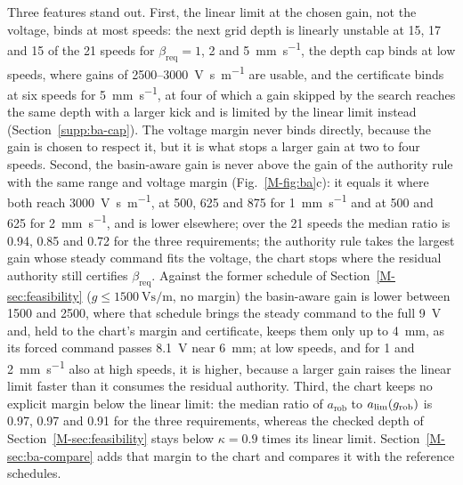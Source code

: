 Three features stand out. First, the linear limit at the chosen gain, not the voltage, binds at most speeds: the next grid depth is linearly unstable at 15, 17 and 15 of the 21 speeds for $\beta_{\mathrm{req}}=1$, 2 and \SI{5}{\milli\metre\per\second}, the depth cap binds at low speeds, where gains of 2500--\SI{3000}{\volt\second\per\metre} are usable, and the certificate binds at six speeds for \SI{5}{\milli\metre\per\second}, at four of which a gain skipped by the search reaches the same depth with a larger kick and is limited by the linear limit instead (Section~\ref{supp:ba-cap}). The voltage margin never binds directly, because the gain is chosen to respect it, but it is what stops a larger gain at two to four speeds. Second, the basin-aware gain is never above the gain of the authority rule with the same range and voltage margin (Fig.~\ref{M-fig:ba}c): it equals it where both reach \SI{3000}{\volt\second\per\metre}, at 500, 625 and \SI{875}{\rpm} for \SI{1}{\milli\metre\per\second} and at 500 and \SI{625}{\rpm} for \SI{2}{\milli\metre\per\second}, and is lower elsewhere; over the 21 speeds the median ratio is 0.94, 0.85 and 0.72 for the three requirements; the authority rule takes the largest gain whose steady command fits the voltage, the chart stops where the residual authority still certifies $\beta_{\mathrm{req}}$. Against the former schedule of Section~\ref{M-sec:feasibility} ($g\le\SI{1500}{\volt\second\per\metre}$, no margin) the basin-aware gain is lower between 1500 and \SI{2500}{\rpm}, where that schedule brings the steady command to the full \SI{9}{\volt} and, held to the chart's margin and certificate, keeps them only up to \SI{4}{\milli\metre}, as its forced command passes \SI{8.1}{\volt} near \SI{6}{\milli\metre}; at low speeds, and for 1 and \SI{2}{\milli\metre\per\second} also at high speeds, it is higher, because a larger gain raises the linear limit faster than it consumes the residual authority. Third, the chart keeps no explicit margin below the linear limit: the median ratio of $a_{\mathrm{rob}}$ to $a_{\lim}(g_{\mathrm{rob}})$ is 0.97, 0.97 and 0.91 for the three requirements, whereas the checked depth of Section~\ref{M-sec:feasibility} stays below $\kappa=0.9$ times its linear limit. Section~\ref{M-sec:ba-compare} adds that margin to the chart and compares it with the reference schedules.
